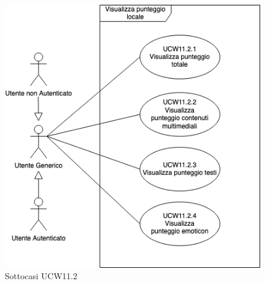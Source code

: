\begin{figure}[H]
	\centering
	\includegraphics[scale=0.5]{UC_images/UCW11-2.png} 
	\caption{Sottocasi UCW11.2}
\end{figure}

